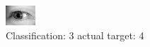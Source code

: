 \begin{figure}[h!]
\begin{center}
\includegraphics[width=0.60\columnwidth]{figures/ID3239_class_3_target_4.png}
\end{center}
\caption{ Classification: 3 actual target: 4}
\label{fig:ID3239_class_3_target_4}
\end{figure}
